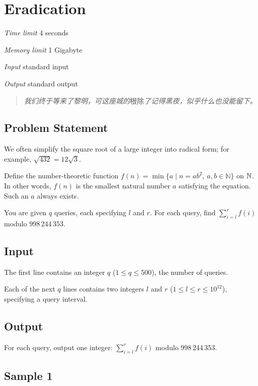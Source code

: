 \section[E. Eradication]{ Eradication}

\textit{Time limit}   4 seconds

\textit{Memory limit} 1 Gigabyte

\textit{Input} \qquad standard input

\textit{Output} \qquad standard output


\begin{quote}
	\textit{我们终于等来了黎明，可这座城的}根除\textit{了记得黑夜，似乎什么也没能留下。}
\end{quote}

\subsection{Problem Statement}

We often simplify the square root of a large integer into radical form; for example, $\sqrt{432}=12\sqrt3$.

Define the number-theoretic function $f(n)=\min\{a \mid n=ab^2,\ a,b\in\mathbb N\}$ on $\mathbb{N}$. In other words, $f(n)$ is the smallest natural number $a$ satisfying the equation. Such an $a$ always exists.

You are given $q$ queries, each specifying $l$ and $r$. For each query, find $\sum_{i=l}^r f(i)$ modulo $998\,244\,353$.

\subsection{Input}

The first line contains an integer $q$ ($1 \le q \le 500$), the number of queries.

Each of the next $q$ lines contains two integers $l$ and $r$ ($1 \le l \le r \le 10^{12}$), specifying a query interval.

\subsection{Output}

For each query, output one integer: $\sum_{i=l}^r f(i)$ modulo $998\,244\,353$.

\subsection{Sample 1}

